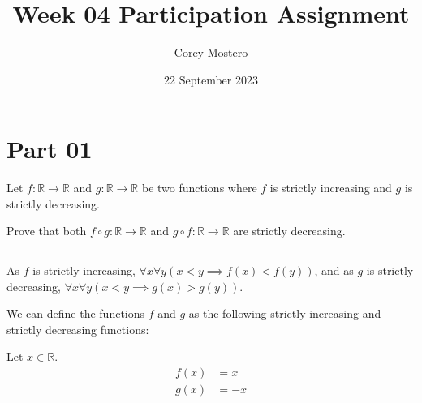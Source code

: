 \documentclass{article}
\title{Week 04 Participation Assignment}
\date{22 September 2023}
\author{Corey Mostero}
\begin{document}
\newcommand{\hr}{\par\noindent\rule{\textwidth}{0.4pt}}

\newcommand{\bc}[1]{
	\begin{equation*}
		\begin{boxed}
			{#1}
		\end{boxed}
	\end{equation*}
}

\newcommand{\cond}[2]{
	\ifmmode
	{#1} \quad {#2}
	\else
	$$ {#1} \quad {#2} $$
	\fi
}

\newcommand{\matr}[1]{
	\ifmmode \bm{#1}
	\else \textit{\textbf{#1}}
	\fi
}
\newcommand{\vect}[1]{
	\ifmmode \mathbf{#1}
	\else \textbf{#1}
	\fi
}


\maketitle
\newpage

\tableofcontents

\section{Part 01}

Let $ f: \mathbb{R} \rightarrow \mathbb{R} $ and $ g: \mathbb{R} \rightarrow \mathbb{R} $ be two functions where $ f $ is strictly increasing and $ g $ is strictly decreasing.

Prove that both $ f \circ g: \mathbb{R} \rightarrow \mathbb{R} $ and $ g \circ f: \mathbb{R} \rightarrow \mathbb{R} $ are strictly decreasing.

\hr

As $ f $ is strictly increasing, $ \forall x \forall y \left( x < y \implies f(x) < f(y) \right) $, and as $ g $ is strictly decreasing, $ \forall x \forall y \left( x < y \implies g(x) > g(y) \right) $.

We can define the functions $ f $ and $ g $ as the following strictly increasing and strictly decreasing functions:

Let $ x \in \mathbb{R} $.
\begin{align*}
	f(x) & = x  \\
	g(x) & = -x
\end{align*}
\end{document}

